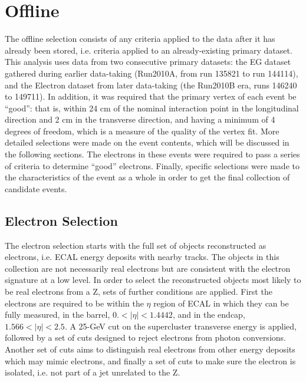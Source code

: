 \section{Offline}
\label{evSel:offline}
The offline selection consists of any criteria applied to the data 
after it has already been stored, 
i.e. criteria applied to an already-existing primary dataset.  
This analysis uses data from two consecutive primary datasets: 
the EG dataset gathered during earlier data-taking 
(Run2010A, from run 135821 to run 144114), 
and the Electron dataset from later data-taking 
(the Run2010B era, runs 146240 to 149711).  
In addition, it was required that the primary vertex of 
each event be ``good'': 
that is, within 24 cm of the nominal interaction point 
in the longitudinal direction
and 2 cm in the transverse direction, 
and having a minimum of 4 degrees of freedom,
which is a measure of the quality of the vertex fit.  %
More detailed selections were made on the event contents, 
which will be discussed in the following sections.  
The electrons in these events were required to pass 
a series of criteria to determine ``good'' electrons.  
Finally, specific selections were made to the 
characteristics of the event as a whole 
in order to get the final collection of \Zee candidate 
events.  

\subsection{Electron Selection}
\label{evSel:elec}
The electron selection starts with the full set of objects reconstructed as electrons, 
i.e. ECAL energy deposits with nearby tracks.  
The objects in this collection are not necessarily real electrons 
but are consistent with the electron signature at a low level.  
In order to select the reconstructed objects most likely to be real electrons from a Z, 
sets of further conditions are applied.  
First the electrons are required to be within the $\eta$ region of ECAL in which 
they can be fully measured, in the barrel, $0. < |\eta| < 1.4442$, 
and in the endcap, $1.566 < |\eta| < 2.5$.  
A 25-GeV cut on the supercluster transverse energy is applied,
followed by a set of cuts designed to reject electrons from photon conversions.  
Another set of cuts aims to distinguish real electrons from other energy deposits which may mimic electrons, 
and finally a set of cuts to make sure the electron is isolated, i.e. not part of a jet unrelated to the Z.  

